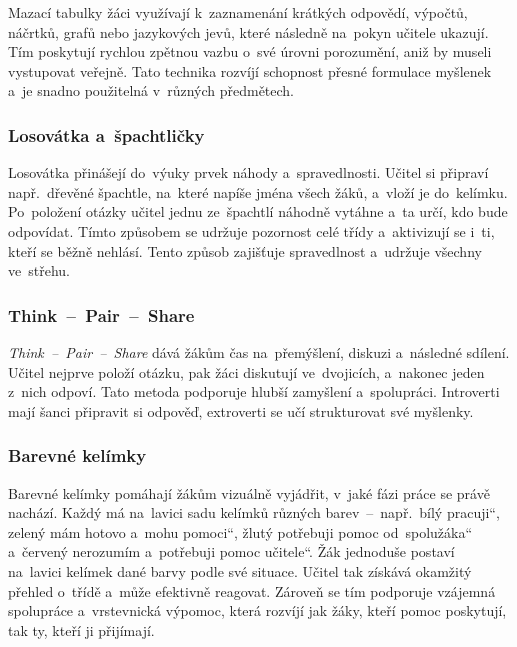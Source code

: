 \documentclass[male,czech,api_bc]{kitheses}
\begin{document}
Mazací tabulky žáci využívají k~zaznamenání krátkých odpovědí, výpočtů, náčrtků, grafů nebo jazykových jevů, které následně na~pokyn učitele ukazují. Tím poskytují rychlou zpětnou vazbu o~své úrovni porozumění, aniž by museli vystupovat veřejně. Tato technika rozvíjí schopnost přesné formulace myšlenek a~je snadno použitelná v~různých předmětech.\cite{eduMazaciTabulky}

\subsubsection{Losovátka a~špachtličky}

Losovátka přinášejí do~výuky prvek náhody a~spravedlnosti. Učitel si připraví např.~dřevěné špachtle, na~které napíše jména všech žáků, a~vloží je do~kelímku. Po~položení otázky učitel jednu ze~špachtlí náhodně vytáhne a~ta určí, kdo bude odpovídat. Tímto způsobem se udržuje pozornost celé třídy a~aktivizují se i~ti, kteří se běžně nehlásí. Tento způsob zajišťuje spravedlnost a~udržuje všechny ve~střehu.\cite{eduLosovatka}

\subsubsection{Think~--~Pair~--~Share}

\textit{Think~--~Pair~--~Share} dává žákům čas na~přemýšlení, diskuzi a~následné sdílení. Učitel nejprve položí otázku, pak žáci diskutují ve~dvojicích, a~nakonec jeden z~nich odpoví. Tato metoda podporuje hlubší zamyšlení a~spolupráci. Introverti mají šanci připravit si odpověď, extroverti se učí strukturovat své myšlenky.\cite{eduThinkPairShare}

\subsubsection{Barevné kelímky}

Barevné kelímky pomáhají žákům vizuálně vyjádřit, v~jaké fázi práce se právě nachází. Každý má na~lavici sadu kelímků různých barev~--~např.~bílý \quotedblbase pracuji``, zelený \quotedblbase mám hotovo a~mohu pomoci``, žlutý \quotedblbase potřebuji pomoc od~spolužáka`` a~červený \quotedblbase nerozumím a~potřebuji pomoc učitele``. Žák jednoduše postaví na~lavici kelímek dané barvy podle své situace. Učitel tak získává okamžitý přehled o~třídě a~může efektivně reagovat. Zároveň se tím podporuje vzájemná spolupráce a~vrstevnická výpomoc, která rozvíjí jak žáky, kteří pomoc poskytují, tak ty, kteří ji přijímají.\cite{eduBarevneKelimky}
\end{document}
